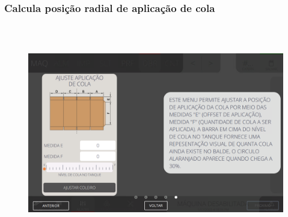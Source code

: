 \newpage
\thispagestyle{fancy}
\vspace*{40 pt}
\subsubsection{\small{Calcula posição radial de aplicação de cola}}\label{miniTelaAjustesDobraCalculaPosicaoRadialAplicacaoCola}
\vspace*{\fill}
\begin{figure}[h]
  \centering
  \includegraphics[width=576px,height=360px]{src/imagesFlexo/07-fold/settings/e-5.png}
\end{figure}
\vspace*{\fill}

\newpage
\thispagestyle{fancy}
\vspace*{40 pt}
